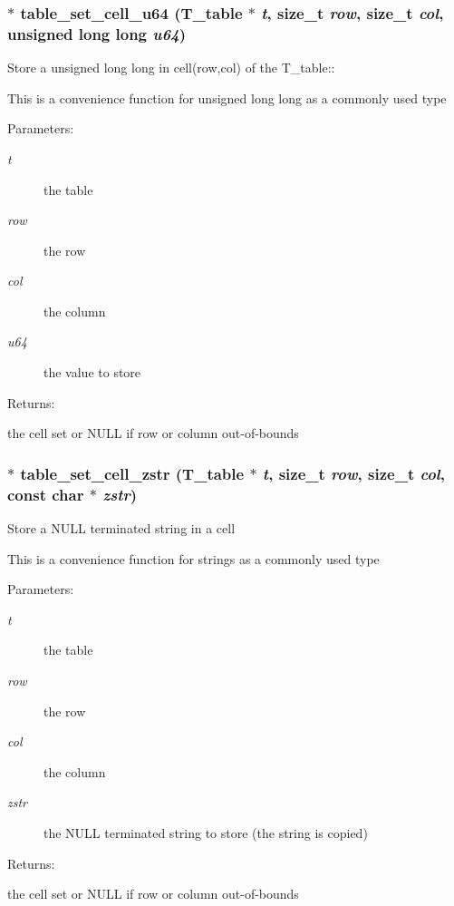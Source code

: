 \subsubsection{$\ast$ table\_\-set\_\-cell\_\-u64 ({\bf T\_\-table} $\ast$ {\em t}, size\_\-t {\em row}, size\_\-t {\em col}, unsigned long long {\em u64})}\label{table_8h_a33}


Store a unsigned long long in cell(row,col) of the T\_\-table::

This is a convenience function for unsigned long long as a commonly used type\begin{Desc}
\item[Parameters: ]\par
\begin{description}
\item[{\em 
t}]the table \item[{\em 
row}]the row \item[{\em 
col}]the column \item[{\em 
u64}]the value to store\end{description}
\end{Desc}
\begin{Desc}
\item[Returns: ]\par
the cell set or NULL if row or column out-of-bounds \end{Desc}
\subsubsection{$\ast$ table\_\-set\_\-cell\_\-zstr ({\bf T\_\-table} $\ast$ {\em t}, size\_\-t {\em row}, size\_\-t {\em col}, const char $\ast$ {\em zstr})}\label{table_8h_a31}


Store a NULL terminated string in a cell

This is a convenience function for strings as a commonly used type\begin{Desc}
\item[Parameters: ]\par
\begin{description}
\item[{\em 
t}]the table \item[{\em 
row}]the row \item[{\em 
col}]the column \item[{\em 
zstr}]the NULL terminated string to store (the string is copied)\end{description}
\end{Desc}
\begin{Desc}
\item[Returns: ]\par
the cell set or NULL if row or column out-of-bounds \end{Desc}


